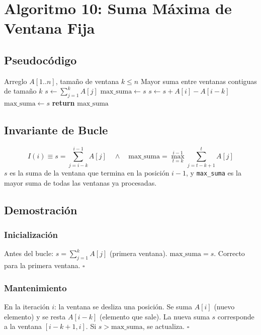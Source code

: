 \documentclass[11pt,a4paper]{article}
\newcommand{\inv}{I}
\begin{document}
\section{Algoritmo 10: Suma Máxima de Ventana Fija}

\subsection{Pseudocódigo}
\begin{algorithm}[H]
\caption{Suma Máxima de Ventana Fija (tamaño $k$)}
\begin{algorithmic}[1]
\Require Arreglo $A[1..n]$, tamaño de ventana $k \leq n$
\Ensure Mayor suma entre ventanas contiguas de tamaño $k$
\State $s \gets \sum_{j=1}^{k} A[j]$ 
\State $\text{max\_suma} \gets s$
    \State $s \gets s + A[i] - A[i - k]$ 
        \State $\text{max\_suma} \gets s$
    \EndIf
\EndFor
\State \textbf{return} $\text{max\_suma}$
\end{algorithmic}
\end{algorithm}

\subsection{Invariante de Bucle}
\[
\boxed{\inv(i) \equiv s = \sum_{j=i-k}^{i-1} A[j] \quad \wedge \quad \text{max\_suma} = \max_{t=k}^{i-1} \sum_{j=t-k+1}^{t} A[j]}
\]
$s$ es la suma de la ventana que termina en la posición $i-1$, y \texttt{max\_suma} es la mayor suma de todas las ventanas ya procesadas.

\subsection{Demostración}

\subsubsection{Inicialización}
Antes del bucle: $s = \sum_{j=1}^{k} A[j]$ (primera ventana). $\text{max\_suma} = s$. Correcto para la primera ventana. $\square$

\subsubsection{Mantenimiento}
En la iteración $i$: la ventana se desliza una posición. Se suma $A[i]$ (nuevo elemento) y se resta $A[i-k]$ (elemento que sale). La nueva suma $s$ corresponde a la ventana $[i-k+1, i]$. Si $s > \text{max\_suma}$, se actualiza. $\square$
\end{document}

